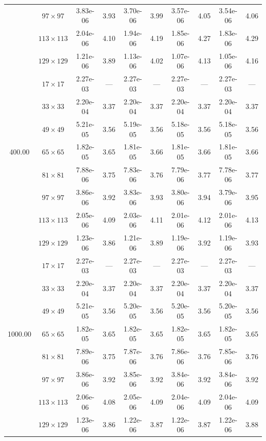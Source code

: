 \documentclass[preprint, 12pt]{elsarticle}
\begin{document}
\begin{center}
\begin{table}[H]
{\begin{tabular*}{\textwidth}{@{\extracolsep\fill}cccccccccc@{}}
    & $97\times 97$ & 3.83e-06 & 3.93 & 3.70e-06 & 3.99 & 3.57e-06 & 4.05 & 3.54e-06 & 4.06 \\
    & $113\times 113$ & 2.04e-06 & 4.10 & 1.94e-06 & 4.19 & 1.85e-06 & 4.27 & 1.83e-06 & 4.29 \\
    & $129\times 129$ & 1.21e-06 & 3.89 & 1.13e-06 & 4.02 & 1.07e-06 & 4.13 & 1.05e-06 & 4.16 \\
    \hline\hline
    \multirow{7}{*}{400.00} & $17\times 17$ & 2.27e-03 & --- & 2.27e-03 & --- & 2.27e-03 & --- & 2.27e-03 & --- \\
    & $33\times 33$ & 2.20e-04 & 3.37 & 2.20e-04 & 3.37 & 2.20e-04 & 3.37 & 2.20e-04 & 3.37 \\
    & $49\times 49$ & 5.21e-05 & 3.56 & 5.19e-05 & 3.56 & 5.18e-05 & 3.56 & 5.18e-05 & 3.56 \\
    & $65\times 65$ & 1.82e-05 & 3.65 & 1.81e-05 & 3.66 & 1.81e-05 & 3.66 & 1.81e-05 & 3.66 \\
    & $81\times 81$ & 7.88e-06 & 3.75 & 7.83e-06 & 3.76 & 7.79e-06 & 3.77 & 7.78e-06 & 3.77 \\
    & $97\times 97$ & 3.86e-06 & 3.92 & 3.83e-06 & 3.93 & 3.80e-06 & 3.94 & 3.79e-06 & 3.95 \\
    & $113\times 113$ & 2.05e-06 & 4.09 & 2.03e-06 & 4.11 & 2.01e-06 & 4.12 & 2.01e-06 & 4.13 \\
    & $129\times 129$ & 1.23e-06 & 3.86 & 1.21e-06 & 3.89 & 1.19e-06 & 3.92 & 1.19e-06 & 3.93 \\
    \hline\hline
    \multirow{7}{*}{1000.00} & $17\times 17$ & 2.27e-03 & --- & 2.27e-03 & --- & 2.27e-03 & --- & 2.27e-03 & --- \\
    & $33\times 33$ & 2.20e-04 & 3.37 & 2.20e-04 & 3.37 & 2.20e-04 & 3.37 & 2.20e-04 & 3.37 \\
    & $49\times 49$ & 5.21e-05 & 3.56 & 5.20e-05 & 3.56 & 5.20e-05 & 3.56 & 5.20e-05 & 3.56 \\
    & $65\times 65$ & 1.82e-05 & 3.65 & 1.82e-05 & 3.65 & 1.82e-05 & 3.65 & 1.82e-05 & 3.65 \\
    & $81\times 81$ & 7.89e-06 & 3.75 & 7.87e-06 & 3.76 & 7.86e-06 & 3.76 & 7.85e-06 & 3.76 \\
    & $97\times 97$ & 3.86e-06 & 3.92 & 3.85e-06 & 3.92 & 3.84e-06 & 3.92 & 3.84e-06 & 3.92 \\
    & $113\times 113$ & 2.06e-06 & 4.08 & 2.05e-06 & 4.09 & 2.04e-06 & 4.09 & 2.04e-06 & 4.09 \\
    & $129\times 129$ & 1.23e-06 & 3.86 & 1.22e-06 & 3.87 & 1.22e-06 & 3.87 & 1.22e-06 & 3.88 \\
    \hline
    \end{tabular*}
}
\end{table}
\end{center}
\end{document}
